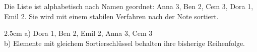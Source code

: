 \question[3]
Die Liste ist alphabetisch nach Namen geordnet: Anna 3, Ben 2, Cem 3, Dora 1, Emil 2. Sie wird mit einem stabilen Verfahren nach der Note sortiert.
\begin{solutionbox}{2.5cm}
a) Dora 1, Ben 2, Emil 2, Anna 3, Cem 3 \\
b) Elemente mit gleichem Sortierschlüssel behalten ihre bisherige Reihenfolge.
\end{solutionbox}
